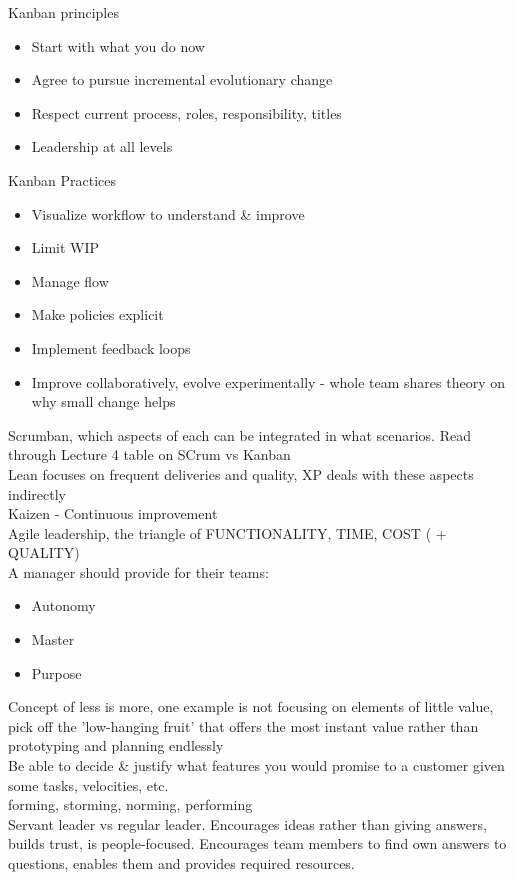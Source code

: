\documentclass[10pt]{article}
\begin{document}
Kanban principles
\begin{itemize}
\item Start with what you do now
\item Agree to pursue incremental evolutionary change
\item Respect current process, roles, responsibility, titles
\item Leadership at all levels
\end{itemize}
Kanban Practices
\begin{itemize}
\item Visualize workflow to understand \& improve
\item Limit WIP
\item Manage flow
\item Make policies explicit
\item Implement feedback loops
\item Improve collaboratively, evolve experimentally - whole team shares theory on why small change helps
\end{itemize}
Scrumban, which aspects of each can be integrated in what scenarios. Read through Lecture 4 table on SCrum vs Kanban\\
Lean focuses on frequent deliveries and quality, XP deals with these aspects indirectly\\
Kaizen - Continuous improvement\\
Agile leadership, the triangle of FUNCTIONALITY, TIME, COST ( + QUALITY)\\
A manager should provide for their teams:
\begin{itemize}
\item Autonomy
\item Master
\item Purpose
\end{itemize}
Concept of less is more, one example is not focusing on elements of little value, pick off the 'low-hanging fruit' that offers the most instant value rather than prototyping and planning endlessly\\
Be able to decide \& justify what features you would promise to a customer given some tasks, velocities, etc.\\
forming, storming, norming, performing\\
Servant leader vs regular leader. Encourages ideas rather than giving answers, builds trust, is people-focused. Encourages team members to find own answers to questions, enables them and provides required resources.\\
\end{document}
